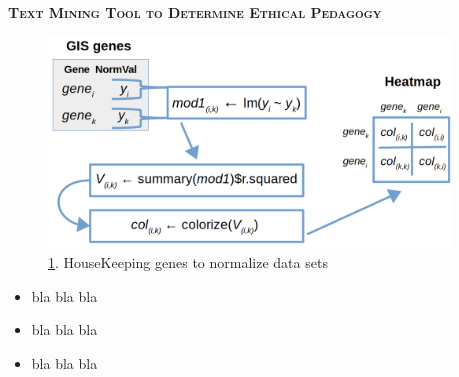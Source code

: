\documentclass[final,t]{beamer}
\begin{document}
\begin{frame}{}
\begin{columns}
\begin{column}{.5\linewidth}
\begin{block}{\textsc{\textbf{Text Mining Tool to Determine Ethical Pedagogy}}}
\begin{center}
				\begin{figure}
					\includegraphics[scale = 0.60]{graphics/lm.png}
					\caption{\ref{fig:lm}. HouseKeeping genes to normalize data sets}
					\label{fig:lm}
				\end{figure}
			\end{center}

				\begin{itemize}
					\item  bla bla bla
					\item  bla bla bla
					\item  bla bla bla
				\end{itemize}
			\vspace*{3mm}
                \end{block}
	\end{column}

%
%
	\begin{column}{.5\linewidth}
%
%
%

%
%


\end{column}
\end{columns}
\end{frame}
\end{document}
